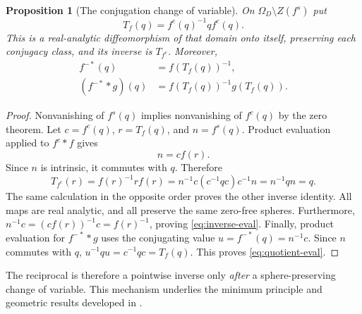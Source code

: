 \documentclass[11pt,a4paper]{article}
\numberwithin{equation}{section}
\newtheorem{proposition}[theorem]{Proposition}
\theoremstyle{definition}
\theoremstyle{remark}
\begin{document}
\begin{proposition}[The conjugation change of variable]
\label{prop:T}
On $\Omega_D\setminus Z(f^s)$ put
\begin{equation}
 T_f(q)=f^c(q)^{-1}qf^c(q).
 \label{eq:T}
\end{equation}
This is a real-analytic diffeomorphism of that domain onto itself, preserving
each conjugacy class, and its inverse is $T_{f^c}$. Moreover,
\begin{align}
 f^{-*}(q)&=f(T_f(q))^{-1},\label{eq:inverse-eval}\\
 (f^{-*}*g)(q)&=f(T_f(q))^{-1}g(T_f(q)).
 \label{eq:quotient-eval}
\end{align}
\end{proposition}
\begin{proof}
Nonvanishing of $f^s(q)$ implies nonvanishing of $f^c(q)$ by the zero theorem.
Let $c=f^c(q)$, $r=T_f(q)$, and $n=f^s(q)$. Product evaluation applied to
$f^c*f$ gives
\[
 n=c f(r).
\]
Since $n$ is intrinsic, it commutes with $q$. Therefore
\[
 T_{f^c}(r)=f(r)^{-1}r f(r)
 =n^{-1}c(c^{-1}qc)c^{-1}n=n^{-1}qn=q.
\]
The same calculation in the opposite order proves the other inverse identity.
All maps are real analytic, and all preserve the same zero-free spheres.
Furthermore,
$n^{-1}c=(c f(r))^{-1}c=f(r)^{-1}$, proving
\eqref{eq:inverse-eval}.
Finally, product evaluation for $f^{-*}*g$ uses the conjugating value
$u=f^{-*}(q)=n^{-1}c$. Since $n$ commutes with $q$,
$u^{-1}qu=c^{-1}qc=T_f(q)$. This proves \eqref{eq:quotient-eval}.
\end{proof}
The reciprocal is therefore a pointwise inverse only \emph{after} a
sphere-preserving change of variable. This mechanism underlies the minimum
principle and geometric results developed in \cite{GStOpen,BS}.
\end{document}
